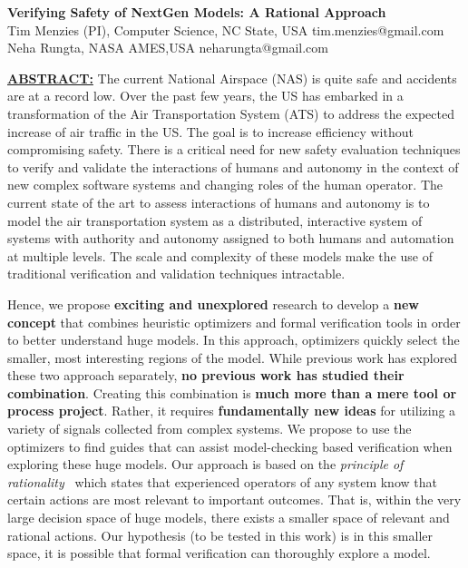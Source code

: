 \documentclass[12pt]{article}
\begin{document}
 
\begin{center}
{\Large {\bf  Verifying Safety of NextGen Models: A Rational Approach}}\\
Tim Menzies (PI), Computer Science, NC State, USA tim.menzies@gmail.com\\ 
Neha Rungta,  NASA AMES,USA  neharungta@gmail.com
\end{center}

\underline{{\bf ABSTRACT:}}  
The current National Airspace (NAS) is quite safe and accidents are at a record low. Over the past few years, the US has embarked in a transformation of the Air Transportation System (ATS) to address the expected increase of air traffic in the US. The goal is to increase efficiency without compromising safety. There is a critical need for new safety evaluation techniques to verify and validate the interactions of humans and autonomy in the context of new complex software systems and changing roles of the human operator. 
The current state of the art to assess interactions of humans and autonomy is to model the air transportation system as a distributed, interactive system of systems with authority and autonomy assigned to both humans and automation at multiple levels. The scale and complexity of these models make the use of traditional verification and validation techniques intractable. 

Hence, we  propose   {\bf exciting and unexplored} research to develop a {\bf new concept} that combines
heuristic optimizers
and formal verification tools in order to better understand huge models. 
 In this approach,  optimizers quickly select the smaller, most interesting regions of the model.
 While previous work has explored these two approach separately, 
{\bf no 
previous work has studied their combination}. Creating this combination is {\bf much more than a mere tool
or process project}. Rather, it requires  {\bf fundamentally new ideas} for  utilizing a variety of signals
collected from complex systems.  
We propose to use the optimizers to find  guides
that can assist model-checking based verification when exploring these huge models. Our approach is based on the  {\em principle of rationality}~\cite{Newell88} which states that experienced operators of any system know that certain actions are most relevant to important outcomes. That is, within the very large decision space of huge models, there exists a  smaller space of relevant and rational actions. 
Our hypothesis (to be tested in this work) is in this smaller space, it is possible that formal verification can thoroughly explore a model.
\end{document}

